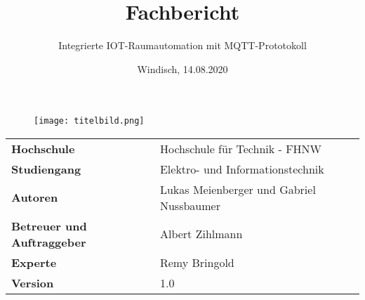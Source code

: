 \documentclass[final]{fhnwreport}         %
\title{Fachbericht}  %
\author{Integrierte IOT-Raumautomation mit MQTT-Prototokoll}                      %
\date{Windisch, 14.08.2020}               %
\begin{document}
\maketitle

\vspace*{-1cm}
\vfill
\begin{figure}[H]
\centering
\texttt{[image: titelbild.png]}
\end{figure}
\vfill

\begin{center}
\renewcommand\arraystretch{2}
\begin{tabular}{>{\bf}p{6cm} l}
Hochschule                 &    Hochschule für Technik - FHNW\\
Studiengang                &    Elektro- und Informationstechnik\\
Autoren   		                 & 	 Lukas Meienberger und Gabriel Nussbaumer\\
Betreuer und Auftraggeber     &     Albert Zihlmann\\
Experte               &   Remy Bringold \\
Version                    &    1.0 %
\end{tabular}
\end{center}

\clearpage
			
\thispagestyle{empty}


\tableofcontents
\clearpage












{\sloppypar
\printbibliography[heading=bibintoc]
}

%

\end{document}
